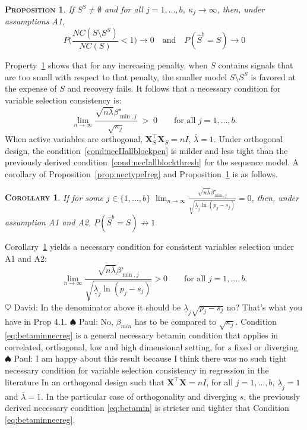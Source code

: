 \documentclass[aos]{imsart}
\theoremstyle{plain}
\newtheorem{prop}{\textsc{Proposition}}[section]
\newtheorem{cor}{\textsc{Corollary}}[section]
\newcommand{\david}[1]{{\small{\color{blue} \sf $\heartsuit$ David: #1}}}
\newcommand{\paul}[1]{{\small{\color{green} \sf $\spadesuit$ Paul: #1}}}
\newcommand{\bs}{\boldsymbol}
\begin{document}
\begin{prop}\label{prop:nectypeIIreg}
    If $S^S\neq\emptyset$ and for all $j=1,\ldots,b$, $\kappa_j\to \infty$, then, under assumptions A1,
    $$P\Big(\frac{NC(S\setminus S^S)}{NC(S)}<1\Big) \to 0 \quad\text{and}\quad P(\hat{S}^b=S)\to 0$$
\end{prop}
Property~\ref{prop:nectypeIIreg} shows that for any increasing penalty, when $S$ contains signals that are too small with respect to that penalty, the smaller model $S\setminus S^S$ is favored at the expense of $S$ and recovery fails. It follows that a necessary condition for variable selection consistency is:
\begin{equation}\label{cond:necIIallblockpen}
\lim_{n\to\infty}\frac{\sqrt{n\bar{\lambda}}\beta_{\min,j}^{\star}}{\sqrt{\kappa_j}}\;>\;0\qquad\mbox{for all }j=1,\ldots,b.
\end{equation}
When active variables are orthogonal, $\bs X_S^{\top}\bs X_S = nI$, $\bar{\lambda}=1$. Under orthogonal design, the condition~\eqref{cond:necIIallblockpen} is milder and less tight than the previously derived condition~\eqref{cond:necIallblockthresh} for the sequence model. A corollary of Proposition~\ref{prop:nectypeIreg} and Proposition~\ref{prop:nectypeIIreg} is as follows. 
\begin{cor}\label{cor:necrecovreg}
    If for some $j\in\{1,\ldots,b\}$   $\lim_{n\to\infty}\frac{\sqrt{n\bar{\lambda}}\beta_{\min,j}^{\star}}{\sqrt{\underline{\lambda}_j\ln(p_j-s_j)}} = 0$, then, under assumption A1 and A2,  $P(\hat{S}^b=S)\not\to 1$
\end{cor}
Corollary~\ref{cor:necrecovreg} yields a necessary condition for consistent variables selection under A1 and A2:
\begin{equation}\label{eq:betaminnecreg}
\lim_{n\to\infty}\frac{\sqrt{n\bar{\lambda}}\beta_{\min,j}^{\star}}{\sqrt{\underline{\lambda}_j\ln(p_j-s_j)}} > 0\qquad\mbox{for all }j=1,\ldots,b.
\end{equation}
\david{In the denominator above it should be $\underline{\lambda}_j \sqrt{p_j-s_j}$ no? That's what you have in Prop 4.1.}\paul{No, $\beta_{min}$ has to be compared to $\sqrt{\kappa_j}$.}
Condition \eqref{eq:betaminnecreg} is a general necessary betamin condition that applies in correlated, orthogonal, low and high dimensional setting, for $s$ fixed or diverging. \paul{I am happy about this result because I think there was no such tight necessary condition for variable selection consistency in regression in the literature} In an orthogonal design such that $\bs X^{\top} \bs X=nI$, for all $j=1,\ldots,b$, $\underline{\lambda}_j=1$ and $\bar{\lambda}=1$. In the particular case of orthogonality and diverging $s$, the previously derived necessary condition \eqref{eq:betamin} is stricter and tighter that Condition \eqref{eq:betaminnecreg}.
\end{document}
